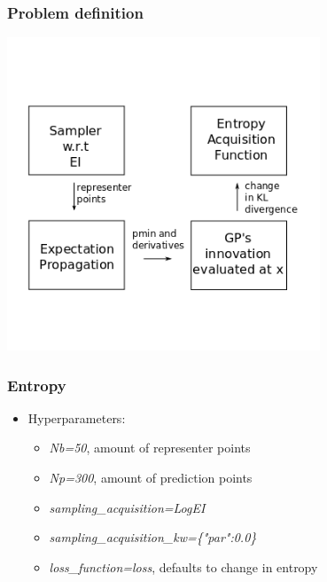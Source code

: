 \documentclass[10pt,handout]{beamer}
\begin{document}
\begin{frame}
\frametitle{Problem definition}

\begin{center}
\includegraphics[width=0.7\textwidth]{robo_entropy.png}
\end{center}
\end{frame}
\begin{frame}
\frametitle{Entropy}
\begin{itemize}
\item Hyperparameters:
\begin{itemize}
\item \emph{Nb=50}, amount of representer points
\item \emph{Np=300}, amount of prediction points
\item \emph{sampling\_acquisition=LogEI}   
\item \emph{sampling\_acquisition\_kw=\{"par":0.0\}}
\item \emph{loss\_function=loss}, defaults to change in entropy
\end{itemize}
\end{itemize}
\end{frame}
\end{document}
